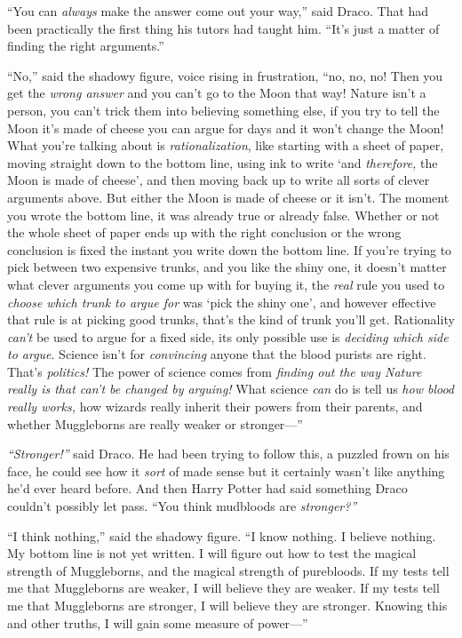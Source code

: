 ``You can \emph{always} make the answer come out your way,'' said Draco.
That had been practically the first thing his tutors had taught him.
``It's just a matter of finding the right arguments.''

``No,'' said the shadowy figure, voice rising in frustration, ``no, no,
no! Then you get the \emph{wrong answer} and you can't go to the Moon
that way! Nature isn't a person, you can't trick them into believing
something else, if you try to tell the Moon it's made of cheese you can
argue for days and it won't change the Moon! What you're talking about
is \emph{rationalization}, like starting with a sheet of paper, moving
straight down to the bottom line, using ink to write `and
\emph{therefore,} the Moon is made of cheese', and then moving back up
to write all sorts of clever arguments above. But either the Moon is
made of cheese or it isn't. The moment you wrote the bottom line, it was
already true or already false. Whether or not the whole sheet of paper
ends up with the right conclusion or the wrong conclusion is fixed the
instant you write down the bottom line. If you're trying to pick between
two expensive trunks, and you like the shiny one, it doesn't matter what
clever arguments you come up with for buying it, the \emph{real} rule
you used to \emph{choose which trunk to argue for} was `pick the shiny
one', and however effective that rule is at picking good trunks, that's
the kind of trunk you'll get. Rationality \emph{can't} be used to argue
for a fixed side, its only possible use is \emph{deciding which side to
argue}. Science isn't for \emph{convincing} anyone that the blood
purists are right. That's \emph{politics!} The power of science comes
from \emph{finding out the way Nature really is that can't be changed by
arguing!} What science \emph{can} do is tell us \emph{how blood really
works,} how wizards really inherit their powers from their parents, and
whether Muggleborns are really weaker or stronger---''

\emph{``Stronger!''} said Draco. He had been trying to follow this, a
puzzled frown on his face, he could see how it \emph{sort} of made sense
but it certainly wasn't like anything he'd ever heard before. And then
Harry Potter had said something Draco couldn't possibly let pass. ``You
think mudbloods are \emph{stronger?''}

``I think nothing,'' said the shadowy figure. ``I know nothing. I
believe nothing. My bottom line is not yet written. I will figure out
how to test the magical strength of Muggleborns, and the magical
strength of purebloods. If my tests tell me that Muggleborns are weaker,
I will believe they are weaker. If my tests tell me that Muggleborns are
stronger, I will believe they are stronger. Knowing this and other
truths, I will gain some measure of power---''

